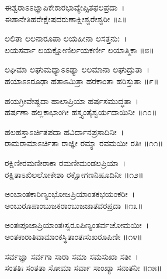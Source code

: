 ಈಶ್ವರಾಽಽಜ್ಞಾಪಿಕೇಕಾರಭಾವ್ಯೇಪ್ಸಿತಫಲಪ್ರದಾ~।\\
ಈಶಾನೇತಿಹರೇಕ್ಷೇಷದರುಣಾಕ್ಷೀಶ್ವರೇಶ್ವರೀ ॥೭॥

ಲಲಿತಾ ಲಲನಾರೂಪಾ ಲಯಹೀನಾ ಲಸತ್ತನುಃ~।\\
ಲಯಸರ್ವಾ ಲಯಕ್ಷೋಣಿರ್ಲಯಕರ್ಣೀ ಲಯಾತ್ಮಿಕಾ ॥೮॥

ಲಘಿಮಾ ಲಘುಮಧ್ಯಾಽಽಢ್ಯಾ ಲಲಮಾನಾ ಲಘುದ್ರುತಾ~।\\
ಹಯಾಽಽರೂಢಾ ಹತಾಽಮಿತ್ರಾ ಹರಕಾಂತಾ ಹರಿಸ್ತುತಾ ॥೯॥

ಹಯಗ್ರೀವೇಷ್ಟದಾ ಹಾಲಾಪ್ರಿಯಾ ಹರ್ಷಸಮುದ್ಧತಾ~।\\
ಹರ್ಷಣಾ ಹಲ್ಲಕಾಭಾಂಗೀ ಹಸ್ತ್ಯಂತೈಶ್ವರ್ಯದಾಯಿನೀ ॥೧೦॥

ಹಲಹಸ್ತಾಽರ್ಚಿತಪದಾ ಹವಿರ್ದಾನಪ್ರಸಾದಿನೀ~।\\
ರಾಮರಾಮಾಽರ್ಚಿತಾ ರಾಜ್ಞೀ ರಮ್ಯಾ ರವಮಯೀ ರತಿಃ ॥೧೧॥

ರಕ್ಷಿಣೀರಮಣೀರಾಕಾ ರಮಣೀಮಂಡಲಪ್ರಿಯಾ~।\\
ರಕ್ಷಿತಾಽಖಿಲಲೋಕೇಶಾ ರಕ್ಷೋಗಣನಿಷೂದಿನೀ ॥೧೨॥

ಅಂಬಾಂತಕಾರಿಣ್ಯಂಭೋಜಪ್ರಿಯಾಂತಕಭಯಂಕರೀ~।\\
ಅಂಬುರೂಪಾಂಬುಜಕರಾಂಬುಜಜಾತವರಪ್ರದಾ ॥೧೩॥

ಅಂತಃಪೂಜಾಪ್ರಿಯಾಂತಃಸ್ವರೂಪಿಣ್ಯಂತರ್ವಚೋಮಯೀ~।\\
ಅಂತಕಾರಾತಿವಾಮಾಂಕಸ್ಥಿತಾಂತಃಸುಖರೂಪಿಣೀ ॥೧೪॥

ಸರ್ವಜ್ಞಾ ಸರ್ವಗಾ ಸಾರಾ ಸಮಾ ಸಮಸುಖಾ ಸತೀ~।\\
ಸಂತತಿಃ ಸಂತತಾ ಸೋಮಾ ಸರ್ವಾ ಸಾಂಖ್ಯಾ ಸನಾತನೀ ॥೧೫॥
